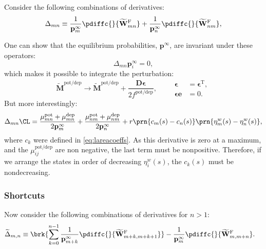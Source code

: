 \documentclass[12pt]{article}
\newcommand{\trans}{^\mathrm{T}}
\newcommand{\onev}{\mathbf{e}}
\newcommand{\pr}{\mathbf{p}}
\newcommand{\eq}{\pr^\infty}
\newcommand{\D}{\mathbf{D}}
\newcommand{\W}{\mathbf{W}}
\newcommand{\M}{\mathbf{M}}
\newcommand{\pot}{^{\text{pot}}}
\newcommand{\dep}{^{\text{dep}}}
\newcommand{\potdep}{^{\text{pot/dep}}}
\newcommand{\Mh}{\widetilde{\M}}
\newcommand{\frgh}{\widetilde{\W}^{\mathrm{F}}}
\begin{document}
Consider the following combinations of derivatives:
%
\begin{equation}\label{eq:areacoeffincrderiv}
    \Delta_{mn} \equiv
      \frac{1}{\eq_{m}} \pdiffc{}{\frgh_{mn}}
      + \frac{1}{\eq_n} \pdiffc{}{\frgh_{nm}},
\end{equation}
%

One can show that the equilibrium probabilities, $\eq$, are invariant under these operators:
%
\begin{equation}\label{eq:sareacoeffincrprob}
  \Delta_{mn} \eq_i = 0,
\end{equation}
%
which makes it possible to integrate the perturbation:
%
\begin{equation}\label{eq:areacoeffincrfinite}
  \Mh\potdep \to \Mh\potdep + \frac{\D\boldsymbol{\epsilon}}{2f\potdep},
  \qquad
  \begin{aligned}
  \boldsymbol{\epsilon} &= \boldsymbol{\epsilon}\trans,
  \\
  \boldsymbol{\epsilon} \onev &= 0.
  \end{aligned}
\end{equation}
%
But more interestingly:
%
\begin{align}
\label{eq:areacoeffincr}
    \Delta_{mn}\CL &=
      \frac{\mu\pot_{mn} + \mu\dep_{mn}}{2\eq_m} + \frac{\mu\pot_{nm} + \mu\dep_{nm}}{2\eq_n}
      + r\prn{c_m(s)-c_n(s)}\prn{\eta^w_{m}(s) - \eta^w_{n}(s)},\\
\end{align}
%
where $c_k$ were defined in \eqref{eq:lareacoeffs}.
As this derivative is zero at a maximum, and the $\mu\potdep_{ij}$ are non negative, the last term must be nonpositive.
Therefore, if we arrange the states in order of decreasing $\eta^w_i(s)$, the $c_k(s)$ must be nondecreasing.


\subsubsection{Shortcuts}\label{sec:shortcuts}

Now consider the following combinations of derivatives for $n>1$:
%
\begin{align}
\label{eq:shortcutderiv}
    \widetilde{\Delta}_{m,n} &\equiv
      \brk{ \sum_{k=0}^{n-1} \frac{1}{\eq_{m+k}} \pdiffc{}{\frgh_{m+k,m+k+1}} }
      - \frac{1}{\eq_m} \pdiffc{}{\frgh_{m,m+ n}}.
\end{align}
%
\end{document}
